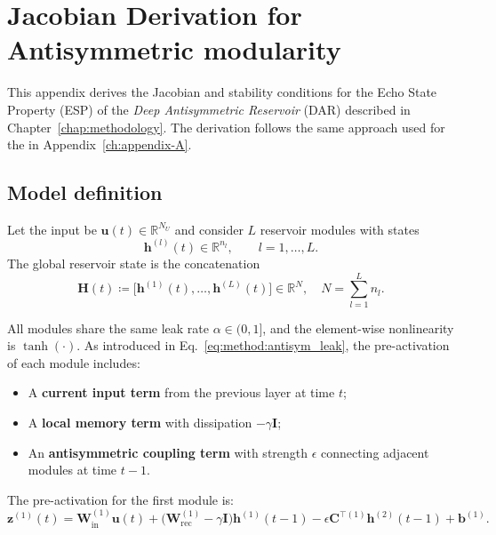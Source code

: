 
\chapter{Jacobian Derivation for Antisymmetric modularity}
\label{ch:appendix-B}

This appendix derives the Jacobian and stability conditions for the Echo State Property (ESP) of the \emph{Deep Antisymmetric Reservoir} (DAR) described in Chapter~\ref{chap:methodology}. The derivation follows the same approach used for the  \DCR in Appendix~\ref{ch:appendix-A}.

\section{Model definition}
\label{sec:dar-definition}

Let the input be $\mathbf{u}(t)\in\mathbb{R}^{N_U}$ and consider $L$ reservoir modules with states
\[
\mathbf{h}^{(l)}(t)\in\mathbb{R}^{n_l},\qquad l=1,\dots,L.
\]
The global reservoir state is the concatenation
\[
\mathbf{H}(t) \coloneqq \big[\mathbf{h}^{(1)}(t),\dots,\mathbf{h}^{(L)}(t)\big] \in \mathbb{R}^{N},\quad N=\sum_{l=1}^L n_l.
\]

All modules share the same leak rate $\alpha\in(0,1]$, and the element-wise nonlinearity is $\tanh(\cdot)$.
As introduced in Eq.~\eqref{eq:method:antisym_leak}, the pre-activation of each module includes:
\begin{itemize}
    \item A \textbf{current input term} from the previous layer at time $t$;
    \item A \textbf{local memory term} with dissipation $-\gamma\mathbf{I}$;
    \item An \textbf{antisymmetric coupling term} with strength $\epsilon$ connecting adjacent modules at time $t-1$.
\end{itemize}

The pre-activation for the first module is:
\begin{equation}
\mathbf{z}^{(1)}(t) =
\mathbf{W}_{\text{in}}^{(1)} \mathbf{u}(t)
+ \big(\mathbf{W}_{\text{rec}}^{(1)} - \gamma \mathbf{I}\big) \mathbf{h}^{(1)}(t-1)
- \epsilon \mathbf{C}^{\top(1)} \mathbf{h}^{(2)}(t-1)
+ \mathbf{b}^{(1)}.
\label{eq:dar-z1}
\end{equation}

